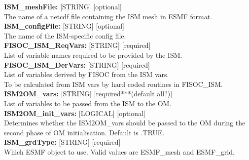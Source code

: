 \documentclass[12pt]{article}
\begin{document}
\begin{flushleft}
\textbf{ISM\_meshFile:}       [STRING] [optional]                          \\
The name of a netcdf file containing the ISM mesh in ESMF format.          \\
\vspace{6pt}
\textbf{ISM\_configFile:}     [STRING] [optional]                          \\
The name of the ISM-specific config file.                                  \\
\vspace{6pt}
\textbf{FISOC\_ISM\_ReqVars:} [STRING] [required]                          \\
List of variable names required to be provided by the ISM.                 \\
\vspace{6pt}
\textbf{FISOC\_ISM\_DerVars:} [STRING] [required]                          \\
List of variables derived by FISOC from the ISM vars.                      \\ 
To be calculated from ISM vars by hard coded routines in FISOC\_ISM.       \\
\vspace{6pt}
\textbf{ISM2OM\_vars:}        [STRING] [required***(default all?)]                          \\
List of variables to be passed from the ISM to the OM.                     \\ 
\vspace{6pt}
\textbf{ISM2OM\_init\_vars:}  [LOGICAL] [optional]                         \\
Determines whether the ISM2OM\_vars should be passed to the OM during the 
second phase of OM initialisation.   Default is .TRUE.                     \\ 
\vspace{6pt}
\textbf{ISM\_grdType:}        [STRING] [required]                          \\
Which ESMF object to use.  Valid values are ESMF\_mesh and ESMF\_grid.     \\
\vspace{6pt}
\vspace{6pt}
\vspace{6pt}


\end{flushleft}
\end{document}
